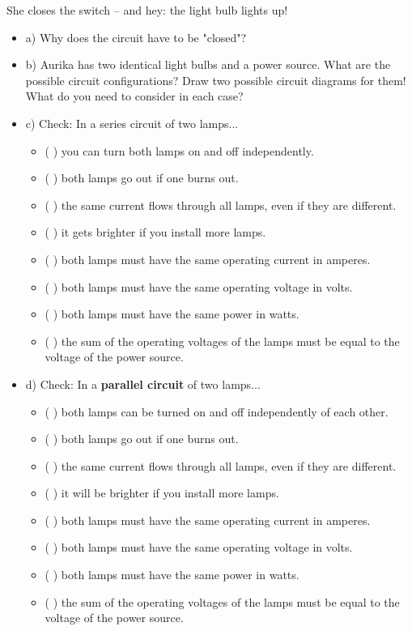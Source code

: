 \documentclass[a4paper,12pt]{article}
\begin{document}
	She closes the switch – and hey: the light bulb lights up!
	
	\begin{itemize}
		\item a) Why does the circuit have to be "closed"?
		
		\vspace{1em}
		\underline{\hspace{12cm}}
		
		\item b) Aurika has two identical light bulbs and a power source.
		What are the possible circuit configurations? Draw two possible circuit diagrams for them!
		What do you need to consider in each case?
		
		\newpage
		\item c) Check:
		In a series circuit of two lamps...
		
		\begin{itemize}
			\item( ) you can turn both lamps on and off independently.
			\item( ) both lamps go out if one burns out.
			\item( ) the same current flows through all lamps, even if they are different.
			\item( ) it gets brighter if you install more lamps.
			\item( ) both lamps must have the same operating current in amperes.
			\item( ) both lamps must have the same operating voltage in volts.
			\item( ) both lamps must have the same power in watts.
			\item( ) the sum of the operating voltages of the lamps must be equal to the voltage of the power source.
		\end{itemize}
		
		\item d) Check:
		In a {\bf parallel circuit } of two lamps...
		
		\begin{itemize}
			\item( ) both lamps can be turned on and off independently of each other.
			\item( ) both lamps go out if one burns out.
			\item( ) the same current flows through all lamps, even if they are different.
			\item( ) it will be brighter if you install more lamps.
			\item( ) both lamps must have the same operating current in amperes.
			\item( ) both lamps must have the same operating voltage in volts.
			\item( ) both lamps must have the same power in watts.
			\item( ) the sum of the operating voltages of the lamps must be equal to the voltage of the power source.
		\end{itemize}
		

\end{itemize}
\end{document}
